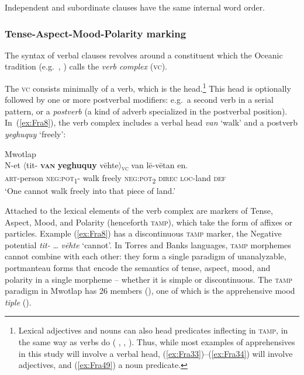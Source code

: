 \documentclass[output=paper,colorlinks,citecolor=brown]{langscibook}
\begin{document}
\noindent Independent and subordinate clauses have the same internal word order.



\subsubsection{Tense-Aspect-Mood-Polarity marking}
\label{subsubsec:tampmarking}

 
The syntax of verbal clauses revolves around a constituent which the Oceanic tradition (e.g.\ \citealt{Durie1988}, \citealt{Evans2003}) calls the \textit{verb complex} (\textsc{vc}). 

The \textsc{vc} consists minimally of a verb, which is the head.\footnote{Lexical adjectives and nouns can also head predicates inflecting in \textsc{tamp}, in the same way as verbs do (\citeauthor{François2005a} \citeyear[131]{François2005a}, \citeyear[328]{François2017}, \citeyear{Françoisforthcomingb}). Thus, while most examples of apprehensives in this study will involve a verbal head, (\ref{ex:Fra33})--(\ref{ex:Fra34}) will involve adjectives, and (\ref{ex:Fra49}) a noun predicate.} This head is optionally followed by one or more postverbal modifiers: e.g.\ a second verb in a serial pattern, or a \textit{postverb} (a kind of adverb specialized in the postverbal position). In~(\ref{ex:Fra8}), the verb complex includes a verbal head \textit{van} `walk' and a postverb \textit{yeghuquy} `freely':
 
\ea \label{ex:Fra8} \textnormal{Mwotlap} \\
\gll N-et ${\langle}$tit- \textbf{\textsc{van}} \textbf{yeghuquy} vēhte${\rangle}$\textnormal{\textsc{\textsubscript{vc}}} van lē-vētan en. \\
\textsc{art}-person \textsc{neg:pot\textsubscript{1}}- walk freely \textsc{neg:pot\textsubscript{2}} \textsc{direc} \textsc{loc}-land \textsc{def} \\
\glt `One cannot walk freely into that piece of land.' 
\z

Attached to the lexical elements of the verb complex are markers of Tense, Aspect, Mood, and Polarity (henceforth \textsc{tamp}), which take the form of affixes or particles. Example (\ref{ex:Fra8}) has a discontinuous \textsc{tamp} marker, the Negative potential \textit{tit-} {\ldots} \textit{vēhte} `cannot'. In Torres and Banks languages, \textsc{tamp} morphemes cannot combine with each other: they form a single paradigm of unanalyzable, portmanteau forms that encode the semantics of tense, aspect, mood, and polarity in a single morpheme -- whether it is simple or discontinuous. The \textsc{tamp} paradigm in Mwotlap has 26 members (\citealt[133]{François2005a}), one of which is the apprehensive mood \textit{tiple} ().
 
\end{document}

